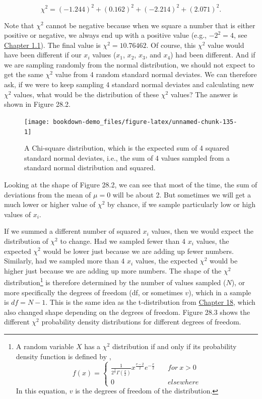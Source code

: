 \documentclass[
]{scrbook}
\begin{document}
\[\chi^{2} = (-1.244)^{2} + (0.162)^{2} + (-2.214)^{2} + (2.071)^{2}.\]

Note that \(\chi^{2}\) cannot be negative because when we square a number that is either positive or negative, we always end up with a positive value (e.g., \(-2^{2} = 4\), see \protect\hyperlink{numbers-and-operations}{Chapter 1.1}).
The final value is \(\chi^{2} = 10.76462\).
Of course, this \(\chi^{2}\) value would have been different if our \(x_{i}\) values (\(x_{1}\), \(x_{2}\), \(x_{3}\), and \(x_{4}\)) had been different.
And if we are sampling randomly from the normal distribution, we should not expect to get the same \(\chi^{2}\) value from 4 random standard normal deviates.
We can therefore ask, if we were to keep sampling 4 standard normal deviates and calculating new \(\chi^{2}\) values, what would be the distribution of these \(\chi^{2}\) values?
The answer is shown in Figure 28.2.

\begin{figure}
\texttt{[image: bookdown-demo\_files/figure-latex/unnamed-chunk-135-1]} \caption{A Chi-square distribution, which is the expected sum of 4 squared standard normal deviates, i.e., the sum of 4 values sampled from a standard normal distribution and squared.}\label{fig:unnamed-chunk-135}
\end{figure}

Looking at the shape of Figure 28.2, we can see that most of the time, the sum of deviations from the mean of \(\mu = 0\) will be about 2.
But sometimes we will get a much lower or higher value of \(\chi^{2}\) by chance, if we sample particularly low or high values of \(x_{i}\).

If we summed a different number of squared \(x_{i}\) values, then we would expect the distribution of \(\chi^{2}\) to change.
Had we sampled fewer than 4 \(x_{i}\) values, the expected \(\chi^{2}\) would be lower just because we are adding up fewer numbers.
Similarly, had we sampled more than 4 \(x_{i}\) values, the expected \(\chi^{2}\) would be higher just because we are adding up more numbers.
The shape of the \(\chi^{2}\) distribution\footnote{A random variable \(X\) has a \(\chi^{2}\) distribution if and only if its probability density function is defined by \citep{Miller2004}, \[f(x) = \left\{\begin{array}{ll}\frac{1}{2^{\frac{2}{v}}\Gamma\left(\frac{v}{2}\right)}x^{\frac{v-2}{2}}e^{-\frac{x}{2}} & \quad for\:x > 0 \\ 0 & \quad elsewhere \end{array}\right.\] In this equation, \(v\) is the degrees of freedom of the distribution.} is therefore determined by the number of values sampled (\(N\)), or more specifically the degrees of freedom (df, or sometimes \(v\)), which in a sample is \(df = N - 1\).
This is the same idea as the t-distribution from \protect\hyperlink{Chapter_18}{Chapter 18}, which also changed shape depending on the degrees of freedom.
Figure 28.3 shows the different \(\chi^{2}\) probability density distributions for different degrees of freedom.
\end{document}
